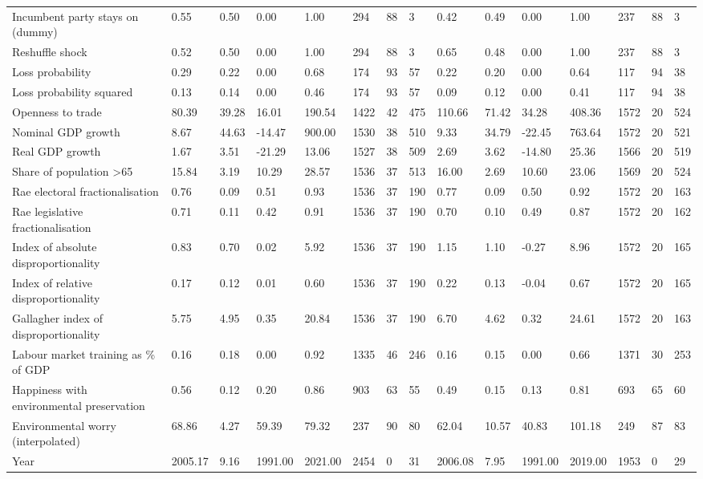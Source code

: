 \begin{longtable}{lllllllllllllll}
Incumbent party stays on (dummy) & 0.55 & 0.50 & 0.00 & 1.00 & 294 & 88 & 3 & 0.42 & 0.49 & 0.00 & 1.00 & 237 & 88 & 3\\
Reshuffle shock & 0.52 & 0.50 & 0.00 & 1.00 & 294 & 88 & 3 & 0.65 & 0.48 & 0.00 & 1.00 & 237 & 88 & 3\\
\addlinespace
Loss probability & 0.29 & 0.22 & 0.00 & 0.68 & 174 & 93 & 57 & 0.22 & 0.20 & 0.00 & 0.64 & 117 & 94 & 38\\
Loss probability squared & 0.13 & 0.14 & 0.00 & 0.46 & 174 & 93 & 57 & 0.09 & 0.12 & 0.00 & 0.41 & 117 & 94 & 38\\
Openness to trade & 80.39 & 39.28 & 16.01 & 190.54 & 1422 & 42 & 475 & 110.66 & 71.42 & 34.28 & 408.36 & 1572 & 20 & 524\\
Nominal GDP growth & 8.67 & 44.63 & -14.47 & 900.00 & 1530 & 38 & 510 & 9.33 & 34.79 & -22.45 & 763.64 & 1572 & 20 & 521\\
Real GDP growth & 1.67 & 3.51 & -21.29 & 13.06 & 1527 & 38 & 509 & 2.69 & 3.62 & -14.80 & 25.36 & 1566 & 20 & 519\\
\addlinespace
Share of population >65 & 15.84 & 3.19 & 10.29 & 28.57 & 1536 & 37 & 513 & 16.00 & 2.69 & 10.60 & 23.06 & 1569 & 20 & 524\\
Rae electoral fractionalisation & 0.76 & 0.09 & 0.51 & 0.93 & 1536 & 37 & 190 & 0.77 & 0.09 & 0.50 & 0.92 & 1572 & 20 & 163\\
Rae legislative fractionalisation & 0.71 & 0.11 & 0.42 & 0.91 & 1536 & 37 & 190 & 0.70 & 0.10 & 0.49 & 0.87 & 1572 & 20 & 162\\
Index of absolute disproportionality & 0.83 & 0.70 & 0.02 & 5.92 & 1536 & 37 & 190 & 1.15 & 1.10 & -0.27 & 8.96 & 1572 & 20 & 165\\
Index of relative disproportionality & 0.17 & 0.12 & 0.01 & 0.60 & 1536 & 37 & 190 & 0.22 & 0.13 & -0.04 & 0.67 & 1572 & 20 & 165\\
\addlinespace
Gallagher index of disproportionality & 5.75 & 4.95 & 0.35 & 20.84 & 1536 & 37 & 190 & 6.70 & 4.62 & 0.32 & 24.61 & 1572 & 20 & 163\\
Labour market training as \% of GDP & 0.16 & 0.18 & 0.00 & 0.92 & 1335 & 46 & 246 & 0.16 & 0.15 & 0.00 & 0.66 & 1371 & 30 & 253\\
Happiness with environmental preservation & 0.56 & 0.12 & 0.20 & 0.86 & 903 & 63 & 55 & 0.49 & 0.15 & 0.13 & 0.81 & 693 & 65 & 60\\
Environmental worry (interpolated) & 68.86 & 4.27 & 59.39 & 79.32 & 237 & 90 & 80 & 62.04 & 10.57 & 40.83 & 101.18 & 249 & 87 & 83\\
Year & 2005.17 & 9.16 & 1991.00 & 2021.00 & 2454 & 0 & 31 & 2006.08 & 7.95 & 1991.00 & 2019.00 & 1953 & 0 & 29\\
\bottomrule
\end{longtable}
